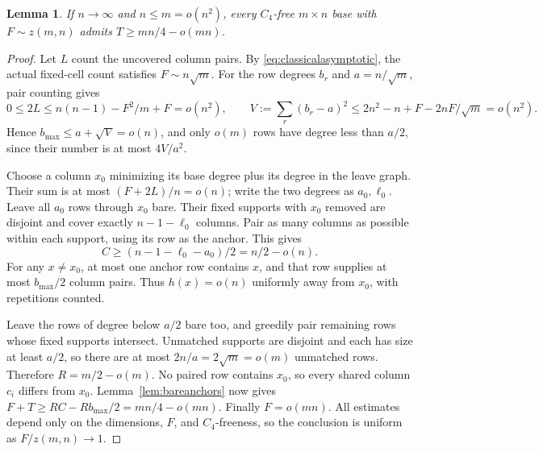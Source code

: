 \documentclass[11pt]{article}
\newtheorem{lemma}[theorem]{Lemma}
\begin{document}
\begin{lemma}\label{lem:universalquarter}
If $n\to\infty$ and $n\le m=o(n^2)$, every $C_4$-free $m\times n$
base with $F\sim z(m,n)$ admits $T\ge mn/4-o(mn)$.
\end{lemma}
\begin{proof}
Let $L$ count the uncovered column pairs. By
\eqref{eq:classicalasymptotic}, the actual fixed-cell count satisfies
$F\sim n\sqrt m$.
For the row degrees $b_r$ and $a=n/\sqrt m$, pair counting gives
\[
 0\le2L\le n(n-1)-F^2/m+F=o(n^2),\qquad
 V:=\sum_r(b_r-a)^2\le2n^2-n+F-2nF/\sqrt m=o(n^2).
\]
Hence $b_{\max}\le a+\sqrt V=o(n)$, and only $o(m)$ rows have
degree less than $a/2$, since their number is at most $4V/a^2$.

Choose a column $x_0$ minimizing its base degree plus its degree in
the leave graph. Their sum is at most $(F+2L)/n=o(n)$; write the
two degrees as $a_0,\ell_0$. Leave all $a_0$ rows through $x_0$
bare. Their fixed supports with $x_0$ removed are disjoint and cover
exactly $n-1-\ell_0$ columns. Pair as many columns as possible within each support, using
its row as the anchor. This gives
\[
 C\ge(n-1-\ell_0-a_0)/2=n/2-o(n).
\]
For any $x\ne x_0$, at most one anchor row contains $x$, and that row
supplies at most $b_{\max}/2$ column pairs. Thus $h(x)=o(n)$ uniformly
away from $x_0$, with repetitions counted.

Leave the rows of degree below $a/2$ bare too, and greedily pair
remaining rows whose fixed supports intersect. Unmatched supports
are disjoint and each has size at least $a/2$, so there are at most
$2n/a=2\sqrt m=o(m)$ unmatched rows. Therefore $R=m/2-o(m)$.
No paired row contains $x_0$, so every shared column $c_i$ differs
from $x_0$. Lemma~\ref{lem:bareanchors} now gives
$F+T\ge RC-Rb_{\max}/2=mn/4-o(mn)$.
Finally $F=o(mn)$. All estimates depend only on the dimensions, $F$,
and $C_4$-freeness, so the conclusion is uniform as $F/z(m,n)\to1$.
\end{proof}
\end{document}
